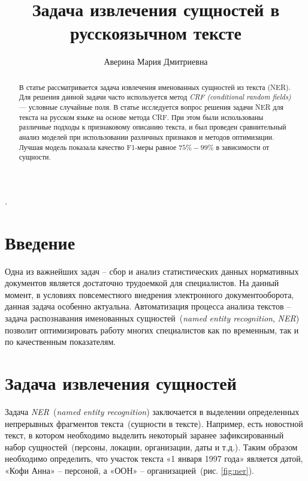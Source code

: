 \documentclass{csmathnotes}
\title{Задача извлечения сущностей в русскоязычном тексте}
\author{Аверина Мария Дмитриевна}
\affiliation{Ярославский государственный университет им. П.\,Г. Демидова}
\begin{document}
\maketitle

\begin{abstract}
В статье рассматривается задача извлечения именованных сущностей из текста (NER).
Для решения данной задачи часто используется метод \emph{CRF (conditional random fields)} --- условные случайные поля.
В статье исследуется вопрос решения задачи NER для текста на русском языке на основе метода CRF.
При этом были использованы различные подходы к признаковому описанию текста, 
и был проведен сравнительный анализ моделей при использовании различных признаков и методов оптимизации.
Лучшая модель показала качество F1-меры равное $75\%-99\%$ в зависимости от сущности.
\end{abstract}

.

\section*{Введение}
Одна из важнейших задач – сбор и анализ статистических данных нормативных
документов является достаточно трудоемкой для специалистов. На данный момент, в условиях повсеместного внедрения электронного документооборота, данная задача особенно актуальна. Автоматизация процесса анализа текстов – задача распознавания именованных сущностей~(\emph{named entity recognition}, \emph{NER})~\cite{base} позволит оптимизировать работу многих специалистов как по временным, так и по качественным показателям.


\section*{Задача извлечения сущностей}

Задача \emph{NER}~(\emph{named entity recognition}) заключается в выделении определенных непрерывных фрагментов текста~(сущности в тексте). Например, есть новостной текст, в котором необходимо выделить некоторый заранее зафиксированный набор сущностей~(персоны, локации, организации, даты и т.д.). Таким образом необходимо определить, что участок текста «1 января 1997 года» является датой, «Кофи Анна» – персоной, а «ООН» – организацией~(рис. \ref{fig:ner}).
\end{document}
